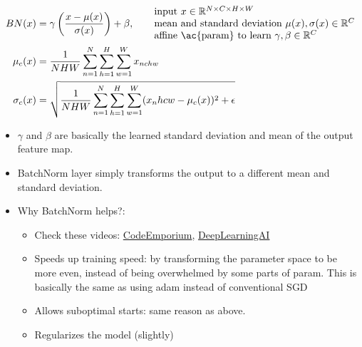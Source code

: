 \begin{align}
	BN(x) &= \gamma \left(\frac{x - \mu(x)}{\sigma(x)}\right) + \beta, \qquad \begin{matrix*}[l]
		\text{input}\ x \in \mathbb{R}^{N \times C \times H \times W}\\
		\text{mean and standard deviation}\ \mu(x), \sigma(x) \in \mathbb{R}^C\\
		\text{affine \ac{param} to learn}\ \gamma, \beta \in \mathbb{R}^C\\
	\end{matrix*}\\
	\mu_c(x) &= \frac{1}{NHW} \sum_{n=1}^{N} \sum_{h=1}^{H} \sum_{w=1}^{W} x_{nchw}\\
	\sigma_c(x)	&= \sqrt{\frac{1}{NHW} \sum_{n=1}^{N} \sum_{h=1}^{H} \sum_{w=1}^{W} (x_nhcw - \mu_c(x))^2 + \epsilon} \label{eq:batch-norm}
\end{align}

\begin{itemize}
	\item $\gamma$ and $\beta$ are basically the learned standard deviation and mean of the output feature map.
	\item \ac{BatchNorm} layer simply transforms the output to a different mean and standard deviation.
	\item Why \ac{BatchNorm} helps?:
	\begin{itemize}
		\item Check these videos: \href{https://youtu.be/DtEq44FTPM4}{CodeEmporium}, \href{https://youtu.be/nUUqwaxLnWs}{DeepLearningAI}
		\item Speeds up training speed: by transforming the parameter space to be more even, instead of being overwhelmed by some parts of \ac{param}. This is basically the same as using \ac{adam} instead of conventional \ac{SGD}
		\item Allows suboptimal starts: same reason as above.
		\item Regularizes the model (slightly)
	\end{itemize}
\end{itemize}

